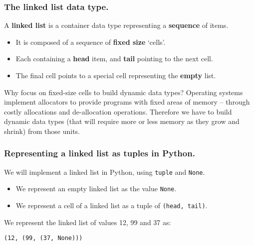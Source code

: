\documentclass{beamer} %
\newcommand\emc[1]{\textcolor{brightblue}{\textbf{#1}}}
\begin{document}
\begin{frame}
\frametitle{The linked list data type.}

A \emc{linked list} is a container data type representing a \emc{sequence} of items. 

\begin{center}
\end{center}

\begin{itemize}
\item It is composed of a sequence of \emc{fixed size} `cells'. 
\item Each containing a \emc{head} item, and \emc{tail} pointing to the next cell.
\item The final cell points to a special cell representing the \emc{empty} list.
\end{itemize}

\begin{block}{Why focus on fixed-size cells to build dynamic data types?}
Operating systems implement allocators to provide programs with fixed areas of memory -- through costly allocations and de-allocation operations. Therefore we have to build dynamic data types (that will require more or less memory as they grow and shrink) from those units.
\end{block}
\end{frame}


\begin{frame}
\frametitle{Representing a linked list as tuples in Python.}

We will implement a linked list in Python, using \texttt{tuple} and \texttt{None}.
\begin{itemize}
\item We represent an empty linked list as the value \texttt{None}.
\item We represent a cell of a linked list as a tuple of \texttt{(head, tail)}.
\end{itemize}

\vspace{3mm}
We represent the linked list of values 12, 99 and 37 as:

\begin{center}
\texttt{(12, (99, (37, None)))}
\end{center}

\end{frame}
\end{document}
